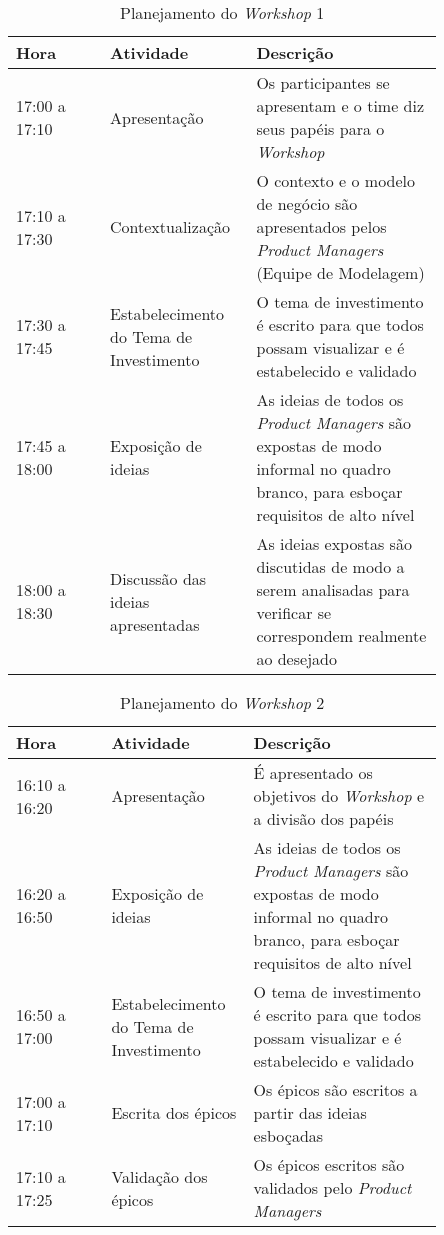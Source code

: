 \begin{table*}[!h]
\centering
\caption{Planejamento do \textit{Workshop} 1}
\label{fig:workshop1}
  \begin{tabular}{|p{0.20\linewidth}|p{0.25\linewidth}|p{0.40\linewidth}|}
  \hline
   Hora  & Atividade & Descrição\\
  \hline

  17:00 a 17:10 & Apresentação & Os participantes se apresentam e o time diz seus papéis para o \textit{Workshop}\\ \hline

  17:10 a 17:30  & Contextualização & O contexto e o modelo de negócio são apresentados pelos \textit{Product Managers} (Equipe de Modelagem)\\\hline

  17:30 a 17:45 & Estabelecimento do Tema de Investimento & O tema de investimento é escrito para que todos possam visualizar e é estabelecido e validado\\\hline
  
  17:45 a 18:00 & Exposição de ideias & As ideias de todos os \textit{Product Managers} são expostas de modo informal no quadro branco, para esboçar requisitos de alto nível\\\hline

  18:00 a 18:30 & Discussão das ideias apresentadas & As ideias expostas são discutidas de modo a serem analisadas para verificar se correspondem realmente ao desejado\\\hline

  \hline
  \end{tabular}
\end{table*}
\vfill
\pagebreak

\begin{table*}[!h]
\centering
\caption{Planejamento do \textit{Workshop} 2}
\label{fig:workshop2}
  \begin{tabular}{|p{0.20\linewidth}|p{0.25\linewidth}|p{0.40\linewidth}|}
  \hline
  Hora  & Atividade & Descrição\\
  \hline

16:10 a 16:20  & Apresentação & É apresentado os objetivos do \textit{Workshop} e a divisão dos papéis \\\hline

16:20 a 16:50 & Exposição de ideias & As ideias de todos os \textit{Product Managers} são expostas de modo informal no quadro branco, para esboçar requisitos de alto nível \\\hline

16:50 a 17:00 & Estabelecimento do Tema de Investimento & O tema de investimento é escrito para que todos possam visualizar e é estabelecido e validado\\\hline

17:00 a 17:10 & Escrita dos épicos & Os épicos são escritos a partir das ideias esboçadas \\\hline

17:10 a 17:25 & Validação dos épicos & Os épicos escritos são validados pelo \textit{Product Managers}\\\hline

  \hline
  \end{tabular}
\end{table*}

